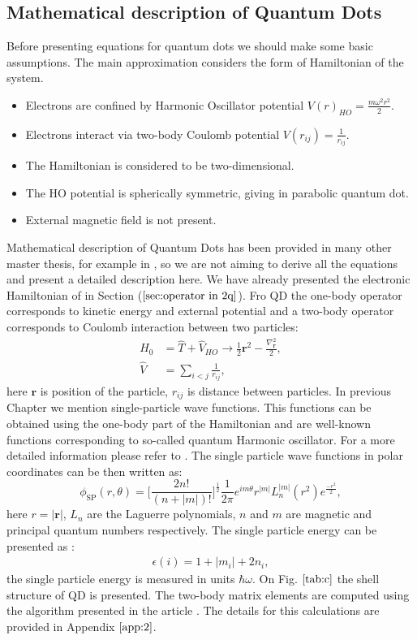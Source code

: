 \documentclass[twoside,english]{uiofysmaster}
\theoremstyle{definition}
\begin{document}
\subsection{Mathematical description of Quantum Dots}\label{sec:math_qd}
Before presenting equations for quantum dots we should make some basic assumptions. The main approximation considers the form of Hamiltonian of the system.\\
\begin{itemize}
	\item Electrons are confined by Harmonic Oscillator potential $V(r)_{HO}=\frac{m\omega^2 r^2}{2}$.
	\item Electrons interact via two-body Coulomb potential  $V(r_{ij})=\frac{1}{r_{ij}}$.
	\item The Hamiltonian is considered to be two-dimensional.
	\item The HO potential is spherically symmetric, giving in parabolic quantum dot.
	\item External magnetic field is not present.
\end{itemize}

Mathematical description of Quantum Dots has been provided in many other master thesis, for example in \cite{lohneCOUPLEDCLUSTERSTUDIESQUANTUM}, so we are not aiming to derive all the equations and present a detailed description here. We have already presented the electronic Hamiltonian of in Section ($\ref{sec:operator in 2q}$). Fro QD the one-body operator corresponds to kinetic energy and external potential and a two-body operator corresponds to Coulomb interaction between two particles:
\begin{align}
\hat{H}_0&= \hat{T}+\hat{V}_{HO} \rightarrow \frac{1}{2} \textbf{r}^2-\frac{\nabla_\textbf{r}^2}{2} ,\\
\hat{V}&= \sum_{i<j}\frac{1}{r_{ij}},
\end{align}
here $\textbf{r}$ is position of the particle, $r_{ij}$ is distance between particles.
In previous Chapter we mention single-particle wave functions. This functions can be obtained using the one-body part of the Hamiltonian and are well-known functions corresponding to so-called quantum Harmonic oscillator. For a more detailed information please refer to \cite{sakuraiModernQuantumMechanics1993}. The single particle wave functions in polar coordinates can be then written as:
\begin{equation}
\phi_\text{SP}(r,\theta)= \bigg[ \frac{2n!}{(n+|m|)!} \bigg]^{\frac{1}{2}} \frac{1}{2\pi} e^{im\theta}r^{|m|}L_n^{|m|}(r^2)e^{\frac{-r^2}{2}},
\end{equation}
here $r=|\textbf{r}|$, $L_n$ are the Laguerre polynomials, $n$ and $m$ are magnetic and principal quantum numbers respectively.
The single particle energy can be presented as :
\begin{eqnarray}
\epsilon(i)= 1+|m_i|+ 2n_i,
\end{eqnarray}
the single particle energy is measured in units $\hbar\omega$. On Fig. $\ref{tab:c}$ the shell structure of QD is presented.
The two-body matrix elements are computed using the algorithm presented in the article \cite{EnergySpectraFewelectron}. The details for this calculations are provided in Appendix $\ref{app:2}$.
\end{document}
